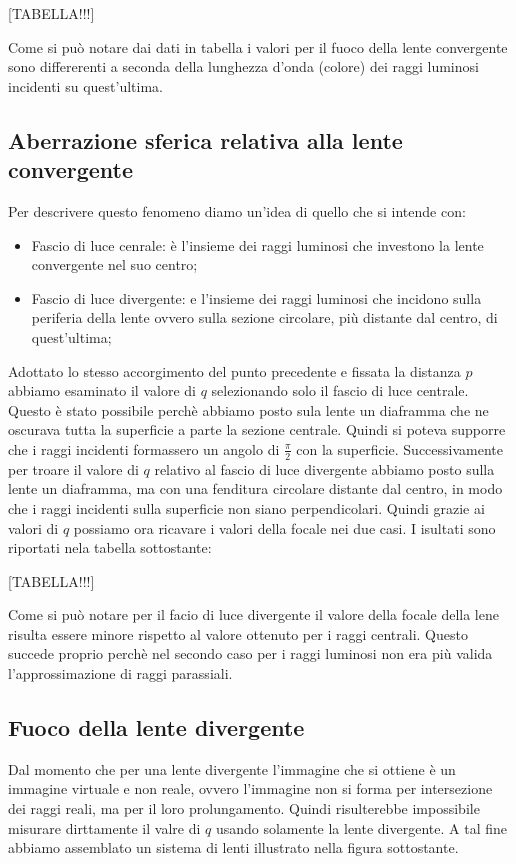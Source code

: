 [TABELLA!!!]

Come si può notare dai dati in tabella i valori per il fuoco della lente convergente sono differerenti a seconda della lunghezza d'onda (colore) dei raggi luminosi incidenti su quest'ultima. 

\subsection{Aberrazione sferica relativa alla lente convergente}

Per descrivere questo fenomeno diamo un'idea di quello che si intende con:
\begin{itemize}
	\item{Fascio di luce cenrale: è l'insieme dei raggi luminosi che investono la lente convergente nel suo centro;}
	\item{Fascio di luce divergente: e l'insieme dei raggi luminosi che incidono sulla periferia della lente ovvero sulla sezione circolare, più distante dal centro, di quest'ultima;}
\end{itemize}
Adottato lo stesso accorgimento del punto precedente e fissata la distanza $p$ abbiamo esaminato il valore di $q$ selezionando solo il fascio di luce centrale. Questo è stato possibile perchè abbiamo posto sula lente un diaframma che ne oscurava tutta la superficie a parte la sezione centrale. Quindi si poteva supporre che i raggi incidenti formassero un angolo di $\frac{\pi}{2}$ con la superficie.
Successivamente per troare il valore di $q$ relativo al fascio di luce divergente abbiamo posto sulla lente un diaframma, ma con una fenditura circolare distante dal centro, in modo che i raggi incidenti sulla superficie non siano perpendicolari.
Quindi grazie ai valori di $q$ possiamo ora ricavare i valori della focale nei due casi. I isultati sono riportati nela tabella sottostante:

[TABELLA!!!]

Come si può notare per il facio di luce divergente il valore della focale della lene risulta essere minore rispetto al valore ottenuto per i raggi centrali. Questo succede proprio perchè nel secondo caso per i raggi luminosi non era più valida l'approssimazione di raggi parassiali.

\subsection{Fuoco della lente divergente}

Dal momento che per una lente divergente l'immagine che si ottiene è un immagine virtuale e non reale, ovvero l'immagine non si forma per intersezione dei raggi reali, ma per il loro prolungamento. Quindi risulterebbe impossibile misurare dirttamente il valre di $q$ usando solamente la lente divergente.
A tal fine abbiamo assemblato un sistema di lenti illustrato nella figura sottostante.

